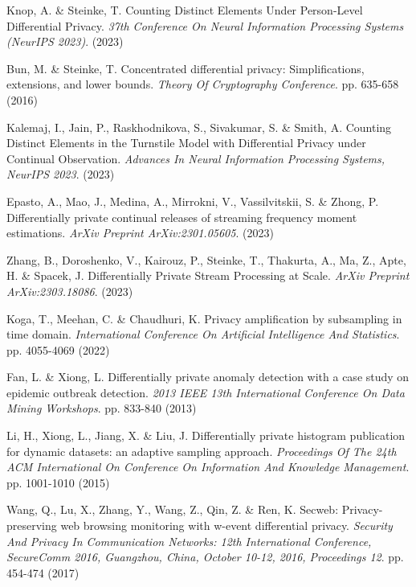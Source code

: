 \begin{thebibliography}{10}
\begin{small}
Knop, A. \& Steinke, T. Counting Distinct Elements Under Person-Level Differential Privacy. {\em 37th Conference On Neural Information Processing Systems (NeurIPS 2023)}. (2023)


Bun, M. \& Steinke, T. Concentrated differential privacy: Simplifications, extensions, and lower bounds. {\em Theory Of Cryptography Conference}. pp. 635-658 (2016)

Kalemaj, I., Jain, P., Raskhodnikova, S., Sivakumar, S. \& Smith, A. Counting Distinct Elements in the Turnstile Model with Differential Privacy under Continual Observation. {\em Advances In Neural Information Processing Systems, NeurIPS 2023}. (2023)

Epasto, A., Mao, J., Medina, A., Mirrokni, V., Vassilvitskii, S. \& Zhong, P. Differentially private continual releases of streaming frequency moment estimations. {\em ArXiv Preprint ArXiv:2301.05605}. (2023)

Zhang, B., Doroshenko, V., Kairouz, P., Steinke, T., Thakurta, A., Ma, Z., Apte, H. \& Spacek, J. Differentially Private Stream Processing at Scale. {\em ArXiv Preprint ArXiv:2303.18086}. (2023)

Koga, T., Meehan, C. \& Chaudhuri, K. Privacy amplification by subsampling in time domain. {\em International Conference On Artificial Intelligence And Statistics}. pp. 4055-4069 (2022)

Fan, L. \& Xiong, L. Differentially private anomaly detection with a case study on epidemic outbreak detection. {\em 2013 IEEE 13th International Conference On Data Mining Workshops}. pp. 833-840 (2013)

Li, H., Xiong, L., Jiang, X. \& Liu, J. Differentially private histogram publication for dynamic datasets: an adaptive sampling approach. {\em Proceedings Of The 24th ACM International On Conference On Information And Knowledge Management}. pp. 1001-1010 (2015)

Wang, Q., Lu, X., Zhang, Y., Wang, Z., Qin, Z. \& Ren, K. Secweb: Privacy-preserving web browsing monitoring with w-event differential privacy. {\em Security And Privacy In Communication Networks: 12th International Conference, SecureComm 2016, Guangzhou, China, October 10-12, 2016, Proceedings 12}. pp. 454-474 (2017)


\end{small}
\end{thebibliography}
